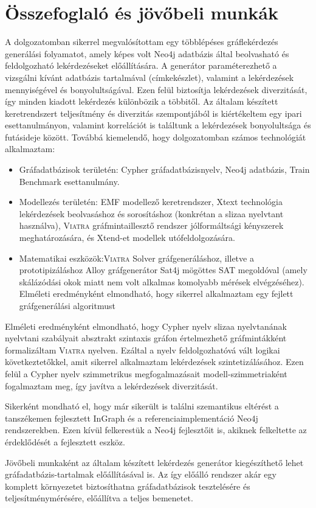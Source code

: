 \chapter{Összefoglaló és jövőbeli munkák}

A dolgozatomban sikerrel megvalósítottam egy többlépéses gráflekérdezés generálási folyamatot, amely képes volt Neo4j adatbázis által beolvasható és feldolgozható lekérdezéseket előállítására. A generátor paraméterezhető a vizsgálni kívánt adatbázis tartalmával (címkekészlet), valamint a lekérdezések mennyiségével és bonyolultságával.
Ezen felül biztosítja lekérdezések diverzitását, így minden kiadott lekérdezés különbözik a többitől.
Az általam készített keretrendszert teljesítmény és diverzitás szempontjából is kiértékeltem egy ipari esettanulmányon, valamint korrelációt is találtunk a lekérdezések bonyolultsága és futásideje között.
Továbbá kiemelendő, hogy dolgozatomban számos technológiát alkalmaztam:
 \begin{itemize}
 	\item Gráfadatbázisok területén: Cypher gráfadatbázisnyelv, Neo4j adatbázis, Train Benchmark esettanulmány.
 	\item Modellezés területén: EMF modellező keretrendszer, Xtext technológia lekérdezések beolvasáshoz és sorosításhoz (konkrétan a slizaa nyelvtant használva), \textsc{Viatra} gráfmintaillesztő rendszer jólformáltsági kényszerek meghatározására, és Xtend-et modellek utófeldolgozására.
 	\item Matematikai eszközök:\textsc{Viatra} Solver gráfgeneráláshoz, illetve a prototipizáláshoz Alloy gráfgenerátor Sat4j mögöttes SAT megoldóval (amely skálázódási okok miatt nem volt alkalmas komolyabb mérések elvégzéséhez).
 	Elméleti eredményként elmondható, hogy sikerrel alkalmaztam egy fejlett gráfgenerálási algoritmust
 \end{itemize}

Elméleti eredményként elmondható, hogy Cypher nyelv slizaa nyelvtanának nyelvtani szabályait absztrakt szintaxis gráfon értelmezhető gráfmintákként formalizáltam \textsc{Viatra} nyelven. Ezáltal a nyelv feldolgozhatóvá vált logikai következtetőkkel, amit sikerrel alkalmaztam lekérdezések szintetizálásához. Ezen felül a Cypher nyelv szimmetrikus megfogalmazásait modell-szimmetriaként fogalmaztam meg, így javítva a lekérdezések diverzitását.

Sikerként mondható el, hogy már sikerült is találni szemantikus eltérést a tanszékemen fejlesztett InGraph 
\cite{MartonSB17} és a referenciaimplementáció Neo4j rendszerekben. Ezen kívül felkerestük a Neo4j fejlesztőit is, akiknek felkeltette az érdeklődését a fejlesztett eszköz.

Jövőbeli munkaként az általam készített lekérdezés generátor kiegészíthető lehet gráfadatbázis-tartalmak előállításával is. Az így előálló rendszer akár egy komplett környezetet biztosíthatna gráfadatbázisok tesztelésére és teljesítménymérésére, előállítva a teljes bemenetet.
